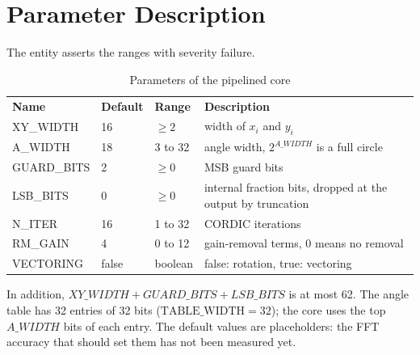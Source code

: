 \documentclass[a4paper, 12pt, notitlepage]{report}
\begin{document}
\section{Parameter Description}
The entity asserts the ranges with severity failure.
\begin{table}[htbp]
   \center\small
   \begin{tabular}{@{}lllp{200pt}@{}}
      \rowcolor{tableheadcolor}\textbf{Name}& \textbf{Default} & \textbf{Range} & \textbf{Description} \\

      XY\_WIDTH   & 16 & $\ge 2$  & width of $x_i$ and $y_i$ \\\midrule
      A\_WIDTH    & 18 & 3 to 32  & angle width, $2^{A\_WIDTH}$ is a full circle \\\midrule
      GUARD\_BITS & 2  & $\ge 0$  & MSB guard bits \\\midrule
      LSB\_BITS   & 0  & $\ge 0$  & internal fraction bits, dropped at the output by truncation \\\midrule
      N\_ITER     & 16 & 1 to 32  & CORDIC iterations \\\midrule
      RM\_GAIN    & 4  & 0 to 12  & gain-removal terms, 0 means no removal \\\midrule
      VECTORING   & false & boolean & false: rotation, true: vectoring \\
      \bottomrule
   \end{tabular}
   \caption{Parameters of the pipelined core}
   \label{tab:pipe_params}
\end{table}
In addition, $XY\_WIDTH + GUARD\_BITS + LSB\_BITS$ is at most 62. The angle table has
32 entries of 32 bits ($\mathrm{TABLE\_WIDTH} = 32$); the core uses the top $A\_WIDTH$ bits of
each entry. The default values are placeholders: the FFT accuracy that should set them has not
been measured yet.
\end{document}
